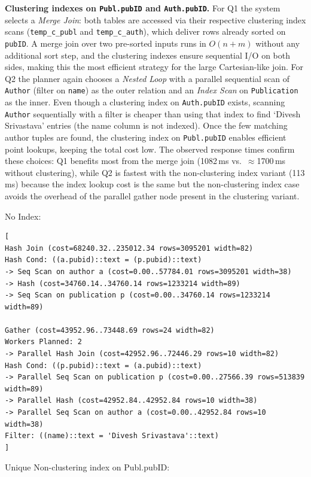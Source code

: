\documentclass[11pt]{scrartcl}
\begin{document}
\textbf{Clustering indexes on \texttt{Publ.pubID} and \texttt{Auth.pubID}.}
For Q1 the system selects a \emph{Merge Join}: both tables are accessed via their respective clustering index scans (\texttt{temp\_c\_publ} and \texttt{temp\_c\_auth}), which deliver rows already sorted on \texttt{pubID}.
A merge join over two pre-sorted inputs runs in $O(n+m)$ without any additional sort step, and the clustering indexes ensure sequential I/O on both sides, making this the most efficient strategy for the large Cartesian-like join.
For Q2 the planner again chooses a \emph{Nested Loop} with a parallel sequential scan of \texttt{Author} (filter on \texttt{name}) as the outer relation and an \emph{Index Scan} on \texttt{Publication} as the inner.
Even though a clustering index on \texttt{Auth.pubID} exists, scanning \texttt{Author} sequentially with a filter is cheaper than using that index to find `Divesh Srivastava' entries (the name column is not indexed).
Once the few matching author tuples are found, the clustering index on \texttt{Publ.pubID} enables efficient point lookups, keeping the total cost low.
The observed response times confirm these choices: Q1 benefits most from the merge join (1082\,ms vs.\ $\approx$1700\,ms without clustering), while Q2 is fastest with the non-clustering index variant (113\,ms) because the index lookup cost is the same but the non-clustering index case avoids the overhead of the parallel gather node present in the clustering variant.

No Index:

{\small
\parskip0pt\begin{verbatim}
[
Hash Join (cost=68240.32..235012.34 rows=3095201 width=82)
Hash Cond: ((a.pubid)::text = (p.pubid)::text)
-> Seq Scan on author a (cost=0.00..57784.01 rows=3095201 width=38)
-> Hash (cost=34760.14..34760.14 rows=1233214 width=89)
-> Seq Scan on publication p (cost=0.00..34760.14 rows=1233214 width=89)

Gather (cost=43952.96..73448.69 rows=24 width=82)
Workers Planned: 2
-> Parallel Hash Join (cost=42952.96..72446.29 rows=10 width=82)
Hash Cond: ((p.pubid)::text = (a.pubid)::text)
-> Parallel Seq Scan on publication p (cost=0.00..27566.39 rows=513839 width=89)
-> Parallel Hash (cost=42952.84..42952.84 rows=10 width=38)
-> Parallel Seq Scan on author a (cost=0.00..42952.84 rows=10 width=38)
Filter: ((name)::text = 'Divesh Srivastava'::text)
]
\end{verbatim}}

Unique Non-clustering index on Publ.pubID:
\end{document}

